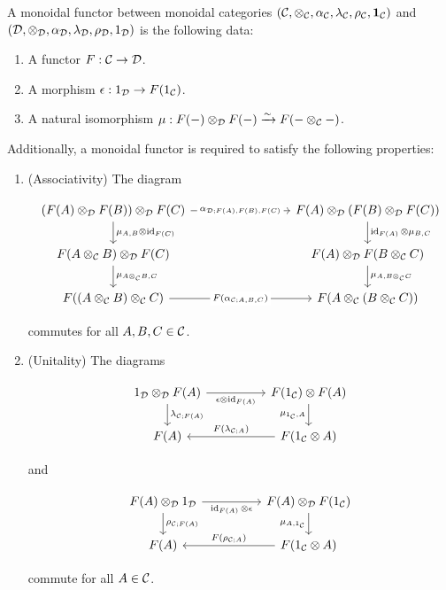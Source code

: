 \begin{defn} A monoidal functor between monoidal categories $({\mathcal C},\otimes_{{\mathcal C}}, \alpha_{{\mathcal C}},\lambda_{{\mathcal C}},\rho_{{\mathcal C}},{\mathbf 1}_{{\mathcal C}})$ and $({\mathcal D},\otimes_{{\mathcal D}},\alpha_{{\mathcal D}},\lambda_{{\mathcal D}},\rho_{{\mathcal D}},1_{{\mathcal D}})$ is the following data:

\begin{enumerate}
\item A functor $F: {\mathcal C}\to {\mathcal D}$.
\item A morphism $\epsilon:1_{{\mathcal D}}\to F(1_{{\mathcal C}})$.
\item A natural isomorphism $\mu: F(\--)\otimes_{{\mathcal D}}F(\--)\xrightarrow{\sim}F(\--\otimes_{{\mathcal C}}\--)$.
\end{enumerate}

Additionally, a monoidal functor is required to satisfy the following properties:

\begin{enumerate}
\item (Associativity) The diagram

\[\begin{tikzcd}
	{(F(A)\otimes_{\cD}F(B))\otimes_{\cD}F(C)} &&& {F(A)\otimes_{\cD}(F(B)\otimes_{\cD}F(C))} \\
	{F(A\otimes_{\cC}B)\otimes_{\cD}F(C)} &&& {F(A)\otimes_{\cD}F(B\otimes_{\cC}C)} \\
	{F((A\otimes_{\cC} B)\otimes_{\cC}C)} && {} & {F(A\otimes_{\cC}(B\otimes_{\cC}C))}
	\arrow["{\mu_{A,B}\otimes \id_{F(C)}}", from=1-1, to=2-1]
	\arrow["{\mu_{A\otimes_{\cC}B,C}}", from=2-1, to=3-1]
	\arrow["{\mu_{A,B\otimes_{\cC}C}}", from=2-4, to=3-4]
	\arrow["{\id_{F(A)}\otimes\mu_{B,C}}", from=1-4, to=2-4]
	\arrow["{F(\alpha_{\cC;A,B,C})}"{description}, from=3-1, to=3-4]
	\arrow["{\alpha_{\cD;F(A),F(B),F(C)}}"{description}, from=1-1, to=1-4]
\end{tikzcd}\]

commutes for all $A,B,C\in {\mathcal C}$.

\item (Unitality) The diagrams

\[\begin{tikzcd}
	{1_{\cD}\otimes_{\cD}F(A)} && {F(1_{\cC})\otimes F(A)} \\
	{F(A)} && {F(1_{\cC}\otimes A)}
	\arrow["{\lambda_{\cC;F(A)}}", from=1-1, to=2-1]
	\arrow["{F(\lambda_{\cC;A})}"', from=2-3, to=2-1]
	\arrow["{\mu_{1_{\cC},A}}"', from=1-3, to=2-3]
	\arrow["{\epsilon\otimes \id_{F(A)}}"', from=1-1, to=1-3]
\end{tikzcd}\]

and

\[\begin{tikzcd}
	{F(A)\otimes_{\cD}1_{\cD}} && {F(A)\otimes_{\cD}F(1_{\cC})} \\
	{F(A)} && {F(1_{\cC}\otimes A)}
	\arrow["{\rho_{\cC;F(A)}}", from=1-1, to=2-1]
	\arrow["{F(\rho_{\cC;A})}"', from=2-3, to=2-1]
	\arrow["{\mu_{A,1_{\cC}}}"', from=1-3, to=2-3]
	\arrow["{\id_{F(A)}\otimes\epsilon}"', from=1-1, to=1-3]
\end{tikzcd}\]

commute for all $A\in {\mathcal C}$.
\end{enumerate}


\end{defn}


